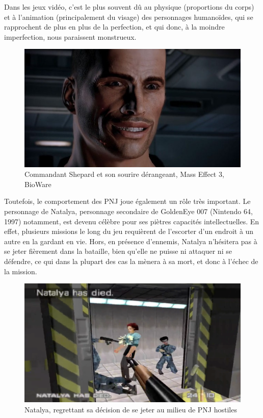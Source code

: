 \documentclass[a4paper, 12pt]{article} %
\begin{document}
Dans les jeux vidéo, c’est le plus souvent dû au physique (proportions du corps) et à l’animation (principalement du visage) des personnages humanoïdes, qui se rapprochent de plus en plus de la perfection, et qui donc, à la moindre imperfection, nous paraissent monstrueux.

\begin{figure}[!h]%
	\begin{center} 
		\includegraphics[width=0.60\columnwidth]{images/shepard.jpg}%
		\caption{Commandant Shepard et son sourire dérangeant, Mass Effect 3, BioWare}%
	\end{center}
\end{figure}

Toutefois, le comportement des PNJ joue également un rôle très important. Le personnage de Natalya, personnage secondaire de GoldenEye 007 (Nintendo 64, 1997) notamment, est devenu célèbre pour ses piètres capacités intellectuelles. En effet, plusieurs missions le long du jeu requièrent de l’escorter d’un endroit à un autre en la gardant en vie. Hors, en présence d’ennemis, Natalya n’hésitera pas à se jeter fièrement dans la bataille, bien qu’elle ne puisse ni attaquer ni se défendre, ce qui dans la plupart des cas la mènera à sa mort, et donc à l’échec de la mission.

\begin{figure}[!h]%
	\begin{center} 
		\includegraphics[width=0.60\columnwidth]{images/natalya.png}%
		\caption{Natalya, regrettant sa décision de se jeter au milieu de PNJ hostiles}%
	\end{center}
\end{figure}
\end{document}
